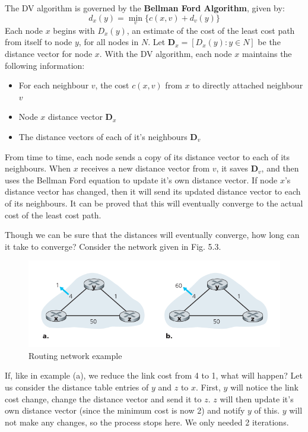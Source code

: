 \documentclass[12pt,letterpaper]{book}
\theoremstyle{definition}
\begin{document}
The DV algorithm is governed by the \textbf{Bellman Ford Algorithm}, given by:
\[d_x (y) = \min_v \{c(x,v) + d_v(y)\}\]
Each node $x$ begins with $D_x(y)$, an estimate of the cost of the least cost path from itself to node $y$, for all nodes in $N$. Let $\mathbf{D}_x = [D_x(y) : y \in N]$ be the distance vector for node $x$. With the DV algorithm, each node $x$ maintains the following information:
\begin{itemize}
  \item For each neighbour $v$, the cost $c(x,v)$ from $x$ to directly attached neighbour $v$
  \item Node $x$ distance vector $\mathbf{D}_x$
  \item The distance vectors of each of it's neighbours $\mathbf{D}_v$
\end{itemize}
From time to time, each node sends a copy of its distance vector to each of its neighbours. When $x$ receives a new distance vector from $v$, it saves $\mathbf{D}_v$, and then uses the Bellman Ford equation to update it's own distance vector.
If node $x$'s distance vector has changed, then it will send its updated distance vector to each of its neighbours. It can be proved that this will eventually converge to the actual cost of the least cost path.

Though we can be sure that the distances will eventually converge, how long can it take to converge? Consider the network given in Fig. 5.3.

\begin{figure}[htpb]
  \centering
  \includegraphics[width=0.8\linewidth]{./assets/dv_eg.png}
  \caption{Routing network example}%
  \label{fig:}
\end{figure}
If, like in example (a), we reduce the link cost from 4 to 1, what will happen? Let us consider the distance table entries of $y$ and $z$ to $x$. First, $y$ will notice the link cost change, change the distance vector and send it to $z$. $z$ will then update it's own distance vector (since the minimum cost is now 2) and notify $y$ of this. $y$ will not make any changes, so the process stops here. We only needed 2 iterations.
\end{document}

